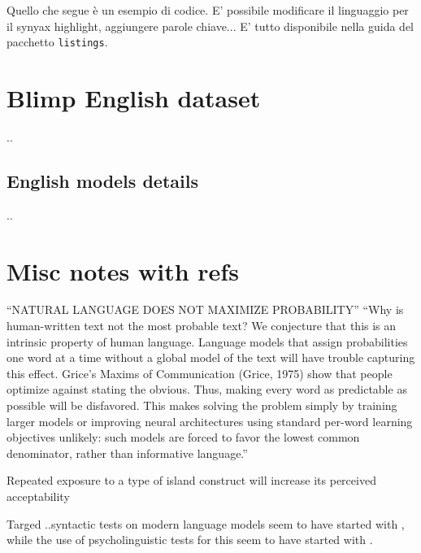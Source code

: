 Quello che segue è un esempio di codice. E' possibile modificare il linguaggio per il synyax highlight, aggiungere parole chiave... E' tutto disponibile nella guida del pacchetto \texttt{listings}.

 

\section{Blimp English dataset}
..
\subsection{English models details}
..

\section{Misc notes with refs}

“NATURAL LANGUAGE DOES NOT MAXIMIZE PROBABILITY” 
“Why is human-written text not the most probable text? We conjecture that this is an intrinsic property of human language. Language models that assign probabilities one word at a time without a global model of the text will have trouble capturing this effect. Grice’s Maxims of Communication (Grice, 1975) show that people optimize against stating the obvious. Thus, making every word as predictable as possible will be disfavored. This makes solving the problem simply by training larger models or improving neural architectures using standard per-word learning objectives unlikely: such models are forced to favor the lowest common denominator, rather than informative language.” 
\citep{holtzman2019curious}

Repeated exposure to a type of island construct will increase its perceived acceptability 
\citep{chaves2014subject}

Targed ..syntactic tests on modern language models seem to have started with \citet{linzen2016assessing}, while the use of psycholinguistic tests for this seem to have started with \citet{futrell2018rnns}.
